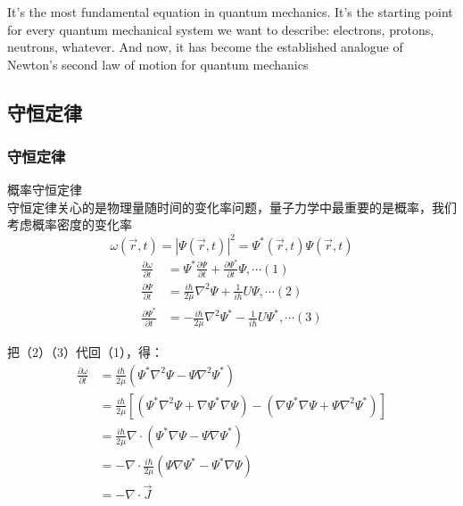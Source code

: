 \begin{frame}
    \frametitle{}
    \centering
    {
      \large {It's the most fundamental equation in quantum mechanics. 
      It's the starting point for every quantum mechanical system we want to describe: electrons, protons, neutrons, whatever.
      And now, it has become the established analogue of Newton's second law of motion for quantum mechanics}
    }
\end{frame}

\subsection{守恒定律}

\begin{frame} 
    \frametitle{守恒定律 }
    {\Bullet} 概率守恒定律\\ \vspace{0.3em}
    守恒定律关心的是物理量随时间的变化率问题，量子力学中最重要的是概率，我们考虑概率密度的变化率
    $$\omega (\vec{r}, t)=|\Psi(\vec{r}, t)|^{2}=\Psi^{*}(\vec{r}, t) \Psi(\vec{r}, t)$$
    \begin{equation*}
        \begin{split}
            \frac{\partial \omega}{\partial t} &=\Psi^{*} \frac{\partial \Psi}{\partial t}+\frac{\partial \Psi^{*}}{\partial t} \Psi, \cdots (1) \\
            \frac{\partial \Psi}{\partial t} & =\frac{i \hbar}{2 \mu} \nabla^{2} \Psi+\frac{1}{i \hbar} U \Psi, \cdots (2) \\
            \frac{\partial \Psi^{*}}{\partial t} & =-\frac{i \hbar}{2 \mu} \nabla^{2} \Psi^{*}-\frac{1}{i \hbar} U \Psi^{*}, \cdots (3) 
        \end{split}
    \end{equation*}
\end{frame}

\begin{frame} 
    把（2）（3）代回（1），得：
    \begin{equation*}
        \begin{split}
        \frac{\partial \omega}{\partial t}
        &=\frac{i \hbar}{2 \mu}\left(\Psi^{*} \nabla^{2} \Psi-\Psi \nabla^{2} \Psi^{*}\right) \\
        &=\frac{i \hbar}{2 \mu}[(\Psi^{*} \nabla^{2} \Psi + \nabla \Psi^{*} \nabla \Psi)- (\nabla \Psi^{*} \nabla \Psi +\Psi \nabla^{2} \Psi^{*})] \\ 
        &=\frac{i \hbar}{2 \mu} \nabla \cdot\left(\Psi^{*} \nabla \Psi-\Psi \nabla \Psi^{*}\right)\\
        &=-\nabla \cdot \frac{i \hbar}{2 \mu} \left(\Psi \nabla \Psi^{*}-\Psi^{*} \nabla \Psi\right) \\
        &=-\nabla \cdot \vec{J}
        \end{split}
    \end{equation*}
\end{frame}

